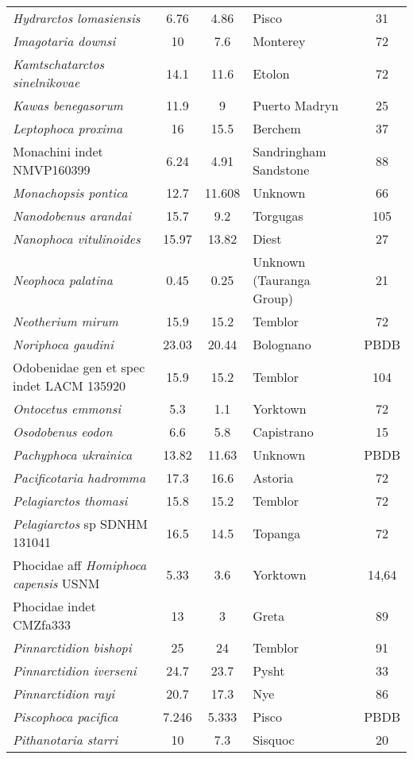 \begin{longtable}{p{}cclc}
\textit{Hydrarctos lomasiensis} & 	6.76	&	4.86	&	Pisco	&31\\
\textit{Imagotaria downsi} & 	10	&	7.6	&	Monterey	&72\\
\textit{Kamtschatarctos sinelnikovae} & 	14.1	&	11.6	&	Etolon	&72\\
\textit{Kawas benegasorum} & 	11.9	&	9	&	Puerto Madryn	&25\\
\textit{Leptophoca proxima} & 	16	&	15.5	&	Berchem	&37\\
Monachini indet NMVP160399 & 	6.24	&	4.91	&	Sandringham Sandstone	&88\\
\textit{Monachopsis pontica} & 	12.7	&	11.608	&	Unknown	&66\\
\textit{Nanodobenus arandai} & 	15.7	&	9.2	&	Torgugas	&105\\
\textit{Nanophoca vitulinoides} & 	15.97	&	13.82	&	Diest	&27\\
\textit{Neophoca palatina} & 	0.45	&	0.25	&	Unknown (Tauranga Group)	&21\\
\textit{Neotherium mirum} & 	15.9	&	15.2	&	Temblor	&72\\
\textit{Noriphoca gaudini} & 	23.03	&	20.44	&	Bolognano	&PBDB\\
Odobenidae gen et spec indet LACM 135920 & 	15.9	&	15.2	&	Temblor	&104\\
\textit{Ontocetus emmonsi} & 	5.3	&	1.1	&	Yorktown	&72\\
\textit{Osodobenus eodon} & 	6.6	&	5.8	&	Capistrano	&15\\
\textit{Pachyphoca ukrainica} & 	13.82	&	11.63	&	Unknown	&PBDB\\
\textit{Pacificotaria hadromma} & 	17.3	&	16.6	&	Astoria	&72\\
\textit{Pelagiarctos thomasi} & 	15.8	&	15.2	&	Temblor	&72\\
\textit{Pelagiarctos} sp SDNHM 131041 & 	16.5	&	14.5	&	Topanga	&72\\
Phocidae aff \textit{Homiphoca capensis} USNM & 	5.33	&	3.6	&	Yorktown	&14,64\\
Phocidae indet CMZfa333 & 	13	&	3	&	Greta	&89\\
\textit{Pinnarctidion bishopi} & 	25	&	24	&	Temblor	&91\\
\textit{Pinnarctidion iverseni} & 	24.7	&	23.7	&	Pysht	&33\\
\textit{Pinnarctidion rayi} & 	20.7	&	17.3	&	Nye	&86\\
\textit{Piscophoca pacifica} & 	7.246	&	5.333	&	Pisco	&PBDB\\
\textit{Pithanotaria starri} & 	10	&	7.3	&	Sisquoc	&20\\

\end{longtable}
